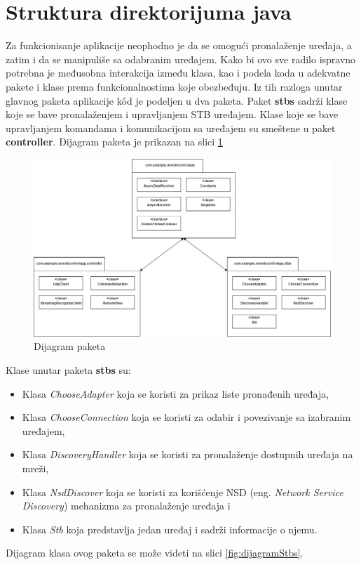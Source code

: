 \documentclass[implementacija.tex]{subfiles}
\begin{document}
\section{Struktura direktorijuma java}
Za funkcionisanje aplikacije neophodno je da se omogući pronalaženje uređaja, a zatim i da se manipuliše sa odabranim uređajem. Kako bi ovo sve radilo ispravno potrebna je međusobna interakcija između klasa, kao i podela koda u adekvatne pakete i klase prema funkcionalnostima koje obezbeđuju. Iz tih razloga unutar glavnog paketa aplikacije k\^{o}d je podeljen u dva paketa. Paket \textbf{stbs} sadrži klase koje se bave pronalaženjem i upravljanjem STB uređajem. Klase koje se bave upravljanjem komandama i komunikacijom sa uređajem su smeštene u paket \textbf{controller}.  Dijagram paketa je prikazan na slici \ref{fig:dijagramPaketa}


\begin{figure}[!ht]
  \centering
  \includegraphics[width=\textwidth]{Implementacija/dijagrami/pakage_diagram.jpg}
  \caption{Dijagram paketa}
  \label{fig:dijagramPaketa}
\end{figure}

Klase unutar paketa \textbf{stbs} su:
\begin{itemize}
\item Klasa \textit{ChooseAdapter} koja se koristi za prikaz liste pronađenih uređaja,
\item Klasa \textit{ChooseConnection} koja se koristi za odabir i povezivanje sa izabranim uređajem,
\item Klasa \textit{DiscoveryHandler} koja se koristi za pronalaženje dostupnih uređaja na mreži,
\item Klasa \textit{NsdDiscover} koja se koristi za korišćenje NSD (eng. \textit{Network Service Discovery}) mehanizma za pronalaženje uređaja i
\item Klasa \textit{Stb} koja predstavlja jedan uređaj i sadrži informacije o njemu.
\end{itemize}
Dijagram klasa ovog paketa se može videti na slici \ref{fig:dijagramStbs}.
\end{document}
